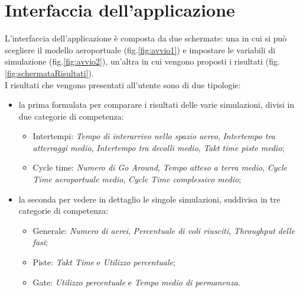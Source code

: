 \documentclass[a4paper, 12pt]{article}
\begin{document}
\newpage

\section{Interfaccia dell'applicazione}

L'interfaccia dell'applicazione è composta da due schermate: una in cui si può scegliere il modello aeroportuale (fig.\ref{fig:avvio1}) e impostare le variabili di simulazione (fig.\ref{fig:avvio2}), un'altra in cui vengono proposti i risultati (fig.\ref{fig:schermataRisultati}).\\


I risultati che vengono presentati all'utente sono di due tipologie: 
\begin{itemize}
	\item la prima formulata per comparare i risultati delle varie simulazioni, divisi in due categorie di competenza:
		\begin{itemize}
		\item Intertempi: \textit{Tempo di interarrivo nello spazio aereo}, \textit{Intertempo tra atterraggi medio}, \textit{Intertempo tra decolli medio}, \textit{Takt time piste medio};
		\item Cycle time: \textit{Numero di Go Around}, \textit{Tempo atteso a terra medio}, \textit{Cycle Time aeroportuale medio}, \textit{Cycle Time complessivo medio};
		\end{itemize}
	\item la seconda per vedere in dettaglio le singole simulazioni, suddivisa in tre categorie di competenza:
		\begin{itemize}
			\item Generale: \textit{Numero di aerei}, \textit{Percentuale di voli riusciti}, \textit{Throughput delle fasi};
			\item Piste: \textit{Takt Time} e \textit{Utilizzo percentuale};
			\item Gate: \textit{Utilizzo percentuale} e \textit{Tempo medio di permanenza}.
		\end{itemize}
\end{itemize}
\end{document}
